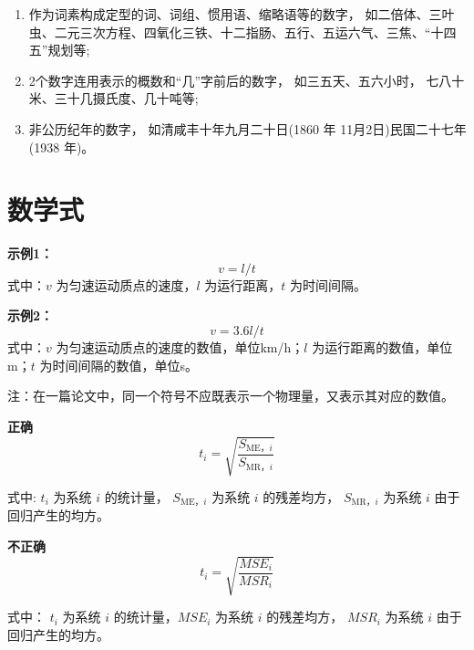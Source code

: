 \begin{enumerate}
\item  作为词素构成定型的词、词组、惯用语、缩略语等的数字， 如二倍体、三叶虫、二元三次方程、四氧化三铁、十二指肠、五行、五运六气、三焦、“十四五”规划等;

\item  2个数字连用表示的概数和“几”字前后的数字， 如三五天、五六小时， 七八十米、三十几摄氏度、几十吨等;

\item 非公历纪年的数字， 如清咸丰十年九月二十日(1860 年 11月2日)民国二十七年(1938 年)。
\end{enumerate}
\SubSectionEnd
\section{ 数学式}
\SubSectionStart
{}

\textbf{\heiti 示例1：}
\[v=l/t\]
式中：$v$ 为匀速运动质点的速度，$l$ 为运行距离，$t$ 为时间间隔。

\textbf{\heiti 示例2：}
\[v=3.6l/t\]
式中：$v$ 为匀速运动质点的速度的数值，单位km/h；$l$ 为运行距离的数值，单位m；$t$ 为时间间隔的数值，单位s。

注：在一篇论文中，同一个符号不应既表示一个物理量，又表示其对应的数值。

\textbf{\heiti 正确}
$$
t_i=\sqrt{\frac{S_{\mathrm{ME}，  i}}{S_{\mathrm{MR}，  i}}}
$$

式中: $t_i$ 为系统 $i$ 的统计量，  $S_{\mathrm{ME}，  i}$ 为系统 $i$ 的残差均方，  $S_{\mathrm{MR}，  i}$ 为系统 $i$ 由于回归产生的均方。

\textbf{\heiti 不正确}
$$
t_i=\sqrt{\frac{M S E_i}{M S R_i}}
$$

式中： $t_i$ 为系统 $i$ 的统计量，$M S E_i$ 为系统 $i$ 的残差均方，  $M S R_i$ 为系统 $i$ 由于回归产生的均方。



